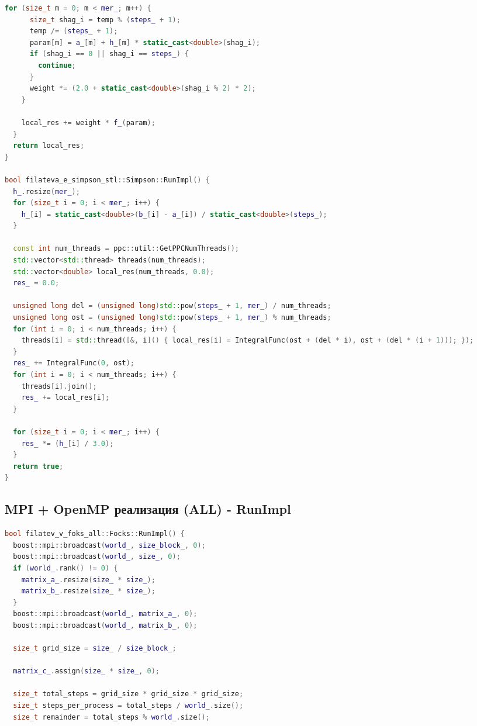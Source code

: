 \documentclass[12pt]{article}
\begin{document}
\begin{thebibliography}{99}
\begin{lstlisting}[language=C++]
    for (size_t m = 0; m < mer_; m++) {
      size_t shag_i = temp % (steps_ + 1);
      temp /= (steps_ + 1);
      param[m] = a_[m] + h_[m] * static_cast<double>(shag_i);
      if (shag_i == 0 || shag_i == steps_) {
        continue;
      }
      weight *= (2.0 + static_cast<double>(shag_i % 2) * 2);
    }

    local_res += weight * f_(param);
  }
  return local_res;
}

bool filateva_e_simpson_stl::Simpson::RunImpl() {
  h_.resize(mer_);
  for (size_t i = 0; i < mer_; i++) {
    h_[i] = static_cast<double>(b_[i] - a_[i]) / static_cast<double>(steps_);
  }

  const int num_threads = ppc::util::GetPPCNumThreads();
  std::vector<std::thread> threads(num_threads);
  std::vector<double> local_res(num_threads, 0.0);
  res_ = 0.0;

  unsigned long del = (unsigned long)std::pow(steps_ + 1, mer_) / num_threads;
  unsigned long ost = (unsigned long)std::pow(steps_ + 1, mer_) % num_threads;
  for (int i = 0; i < num_threads; i++) {
    threads[i] = std::thread([&, i]() { local_res[i] = IntegralFunc(ost + (del * i), ost + (del * (i + 1))); });
  }
  res_ += IntegralFunc(0, ost);
  for (int i = 0; i < num_threads; i++) {
    threads[i].join();
    res_ += local_res[i];
  }

  for (size_t i = 0; i < mer_; i++) {
    res_ *= (h_[i] / 3.0);
  }
  return true;
}
\end{lstlisting}
\newpage

\subsection{MPI + OpenMP реализация (ALL) - RunImpl}
\begin{lstlisting}[language=C++]
bool filatev_v_foks_all::Focks::RunImpl() {
  boost::mpi::broadcast(world_, size_block_, 0);
  boost::mpi::broadcast(world_, size_, 0);
  if (world_.rank() != 0) {
    matrix_a_.resize(size_ * size_);
    matrix_b_.resize(size_ * size_);
  }
  boost::mpi::broadcast(world_, matrix_a_, 0);
  boost::mpi::broadcast(world_, matrix_b_, 0);

  size_t grid_size = size_ / size_block_;

  matrix_c_.assign(size_ * size_, 0);

  size_t total_steps = grid_size * grid_size * grid_size;
  size_t steps_per_process = total_steps / world_.size();
  size_t remainder = total_steps % world_.size();


\end{lstlisting}
\end{thebibliography}
\end{document}
